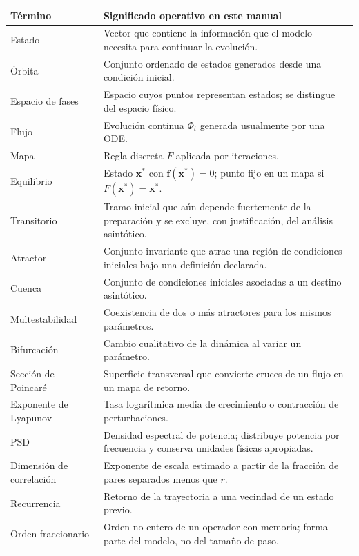 \documentclass[11pt,a4paper]{article}
\begin{document}
\begin{longtable}{>{\raggedright\arraybackslash}p{}
                  >{\raggedright\arraybackslash}p{}}
\toprule
Término & Significado operativo en este manual\\
\midrule
\endhead
Estado & Vector que contiene la información que el modelo necesita para continuar la evolución.\\
Órbita & Conjunto ordenado de estados generados desde una condición inicial.\\
Espacio de fases & Espacio cuyos puntos representan estados; se distingue del espacio físico.\\
Flujo & Evolución continua $\Phi_t$ generada usualmente por una ODE.\\
Mapa & Regla discreta $F$ aplicada por iteraciones.\\
Equilibrio & Estado $\mathbf{x}^*$ con $\mathbf f(\mathbf{x}^*)=0$; punto fijo en un mapa si $F(\mathbf{x}^*)=\mathbf{x}^*$.\\
Transitorio & Tramo inicial que aún depende fuertemente de la preparación y se excluye, con justificación, del análisis asintótico.\\
Atractor & Conjunto invariante que atrae una región de condiciones iniciales bajo una definición declarada.\\
Cuenca & Conjunto de condiciones iniciales asociadas a un destino asintótico.\\
Multestabilidad & Coexistencia de dos o más atractores para los mismos parámetros.\\
Bifurcación & Cambio cualitativo de la dinámica al variar un parámetro.\\
Sección de Poincaré & Superficie transversal que convierte cruces de un flujo en un mapa de retorno.\\
Exponente de Lyapunov & Tasa logarítmica media de crecimiento o contracción de perturbaciones.\\
PSD & Densidad espectral de potencia; distribuye potencia por frecuencia y conserva unidades físicas apropiadas.\\
Dimensión de correlación & Exponente de escala estimado a partir de la fracción de pares separados menos que $r$.\\
Recurrencia & Retorno de la trayectoria a una vecindad de un estado previo.\\
Orden fraccionario & Orden no entero de un operador con memoria; forma parte del modelo, no del tamaño de paso.\\
\bottomrule
\end{longtable}
\end{document}
